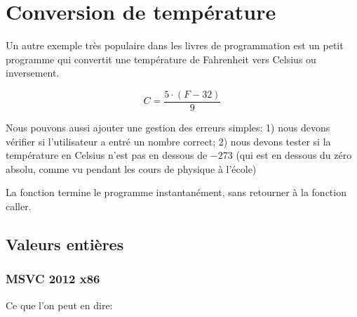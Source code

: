 ﻿\section{Conversion de température}

Un autre exemple très populaire dans
les livres de programmation est un petit programme qui convertit une température de Fahrenheit vers Celsius ou inversement.

\[
	C=\frac{5 \cdot (F-32)}{9}
\]

Nous pouvons aussi ajouter une gestion des erreurs simples:
1) nous devons vérifier si l'utilisateur a entré un nombre correct;
2) nous devons tester si la température en Celsius n'est pas en dessous de $-273$ 
(qui est en dessous du zéro absolu, comme vu pendant les cours de physique à l'école)

La fonction  termine 
le programme instantanément, sans retourner à la fonction \gls{caller}.

\subsection{Valeurs entières}



\subsubsection{\Optimizing MSVC 2012 x86}



Ce que l'on peut en dire:

